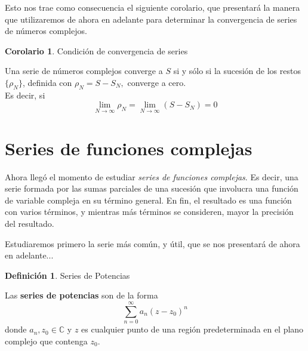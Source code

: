 \documentclass[12pt]{article}
\theoremstyle{definition}
\newtheorem{definition}{Definici\'on}[section]
\theoremstyle{theorem}
\theoremstyle{corolary}
\newtheorem{corolary}{Corolario}[section]
\theoremstyle{method}
\begin{document}
Esto nos trae como consecuencia el siguiente corolario, que presentar\'a la manera que utilizaremos de ahora en adelante para determinar la convergencia de series de n\'umeros complejos.\\

\colorbox{pink!40!white!80}{\parbox{\linewidth}{
\theoremstyle{theorem}
\begin{corolary} {Condici\'on de convergencia de series}

Una serie de n\'umeros complejos converge a $S$ si y s\'olo si la sucesi\'on de los restos $\{\rho_N\}$, definida con $\rho_N=S - S_N,$ converge a cero.\\
Es decir, si $$\lim\limits_{N\rightarrow \infty}\rho_N=\lim\limits_{N\rightarrow \infty}(S-S_N)=0$$
\end{corolary}}}
\linebreak
\linebreak




\section{Series de funciones complejas}
Ahora lleg\'o el momento de estudiar \textit{series de funciones complejas}. Es decir, una serie formada por las sumas parciales de una sucesi\'on que involucra una funci\'on de variable compleja en su t\'ermino general. En fin, el resultado es una funci\'on con varios t\'erminos, y mientras m\'as t\'erminos se consideren, mayor la precisi\'on del resultado.

Estudiaremos primero la serie m\'as com\'un, y \'util, que se nos presentar\'a de ahora en adelante...\\


\colorbox{yellow!40!white!80}{\parbox{\linewidth}{
\theoremstyle{definition}
\begin{definition}{Series de Potencias}

Las \textbf{series de potencias} son de la forma $$\sum\limits_{n=0}^{\infty}a_n(z-z_0)^n$$ donde $a_n, z_0\in \mathbb{C}$ y $z$ es cualquier punto de una regi\'on predeterminada en el plano complejo que contenga $z_0$.

\end{definition}}}
\linebreak
\linebreak
\end{document}
